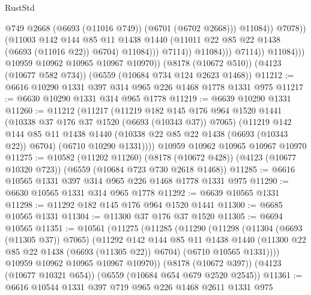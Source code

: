 \begin{lexlean}{RustStd}
\begin{coremodule}
                                          @749
                                          @2668
                                          (@6693 (@11016 @749))
                                          (@6701 (@6702 @2668)))
                                        @11084))
                                    @7078))
                                (@11003
                                  @142
                                  @144
                                  @85
                                  @11
                                  @1438
                                  @1440
                                  (@11011 @22 @85 @22 @1438 (@6693 (@11016 @22)) @6704)
                                  @11084)))
                            @7114))
                        @11084)))
                  @7114))
              @11084)))
        @10959
        @10962
        @10965
        @10967
        @10970))
    (@8178 (@10672 @510))
    (@4123 (@10677 @582 @734))
    (@6559 (@10684 @734 @124 @2623 @1468))
@11212 := @6616 @10290 @1331 @397 @314 @965 @226 @1468 @1778 @1331 @975
@11217 := @6630 @10290 @1331 @314 @965 @1778
@11219 := @6639 @10290 @1331
@11260 := @11212
    (@11217
      (@11219
        @182
        @145
        @176
        @964
        @1520
        @1441
        (@10338 @37 @176 @37 @1520 (@6693 (@10343 @37)) @7065)
        (@11219
          @142
          @144
          @85
          @11
          @1438
          @1440
          (@10338 @22 @85 @22 @1438 (@6693 (@10343 @22)) @6704)
          (@6710 @10290 @1331))))
    @10959
    @10962
    @10965
    @10967
    @10970
@11275 := @10582
    (@11202 @11260)
    (@8178 (@10672 @428))
    (@4123 (@10677 @10320 @723))
    (@6559 (@10684 @723 @730 @2618 @1468))
@11285 := @6616 @10565 @1331 @397 @314 @965 @226 @1468 @1778 @1331 @975
@11290 := @6630 @10565 @1331 @314 @965 @1778
@11292 := @6639 @10565 @1331
@11298 := @11292 @182 @145 @176 @964 @1520 @1441
@11300 := @6685 @10565 @1331
@11304 := @11300 @37 @176 @37 @1520
@11305 := @6694 @10565
@11351 := @10561
    (@11275
      (@11285
        (@11290
          (@11298
            (@11304 (@6693 (@11305 @37)) @7065)
            (@11292
              @142
              @144
              @85
              @11
              @1438
              @1440
              (@11300 @22 @85 @22 @1438 (@6693 (@11305 @22)) @6704)
              (@6710 @10565 @1331))))
        @10959
        @10962
        @10965
        @10967
        @10970))
    (@8178 (@10672 @397))
    (@4123 (@10677 @10321 @654))
    (@6559 (@10684 @654 @679 @2520 @2545))
@11361 := @6616 @10544 @1331 @397 @719 @965 @226 @1468 @2611 @1331 @975

\end{coremodule}
\end{lexlean}
